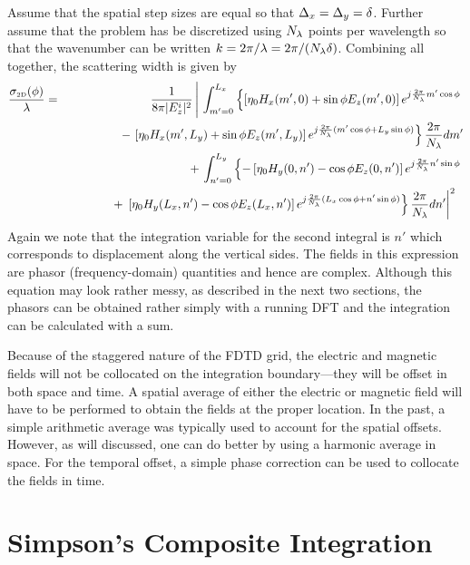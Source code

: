 Assume that the spatial step sizes are equal so that
$\Delta_x=\Delta_y=\delta$.  Further assume that the problem has be
discretized using $N_\lambda$ points per wavelength so that the wavenumber
can be written $k=2\pi/\lambda=2\pi/(N_\lambda\delta)$.  Combining all
together, the scattering width is given by
\begin{eqnarray}
\frac{\sigma_{\mbox{\tiny 2D}}(\phi)}{\lambda} &=& \frac{1}{8\pi|E^i_z|^2}
\left|\,\,
\int^{L_x}_{m'=0}
\left\{\left[\eta_0 H_x(m',0) + \sin\phi E_z(m',0)\right]
  e^{j\frac{2\pi}{N_\lambda}m'\cos\phi}\right.\right.  \nonumber\\
&&
\mbox{\hspace{.48in}} -
\left.\left[\eta_0 H_x(m',L_y) + \sin\phi E_z(m',L_y)\right]
  e^{j\frac{2\pi}{N_\lambda}(m'\cos\phi + L_y\sin\phi)}
  \right\}\frac{2\pi}{N_\lambda}dm' \nonumber\\ 
&&\mbox{\hspace{.13in}} +
\left.\int^{L_y}_{n'=0}
\left\{-\left[\eta_0 H_y(0,n') - \cos\phi E_z(0,n')\right]
  e^{j\frac{2\pi}{N_\lambda}n'\sin\phi}
  \right.\right. \nonumber\\
&&
\mbox{\hspace{.48in}} +
\left.\left.\left[\eta_0 H_y(L_x,n') - \cos\phi E_z(L_x,n')\right]
  e^{j\frac{2\pi}{N_\lambda}(L_x\cos\phi+n'\sin\phi)}\right\}
  \frac{2\pi}{N_\lambda}dn'\right|^2\,\,\,\mbox{}
\label{eq:sall}
\end{eqnarray}
Again we note that the integration variable for the second integral is
$n'$ which corresponds to displacement along the vertical sides.  The
fields in this expression are phasor (frequency-domain) quantities and
hence are complex.  Although this equation may look rather messy, as
described in the next two sections, the phasors can be obtained rather
simply with a running DFT and the integration can be calculated with a
sum.

Because of the staggered nature of the FDTD grid, the electric and
magnetic fields will not be collocated on the integration
boundary---they will be offset in both space and time.  A spatial
average of either the electric or magnetic field will have to be
performed to obtain the fields at the proper location.  In the past, a
simple arithmetic average was typically used to account for the
spatial offsets.  However, as will discussed, one can do better by
using a harmonic average in space.  For the temporal offset, a simple
phase correction can be used to collocate the fields in time.


\section{Simpson's Composite Integration}

